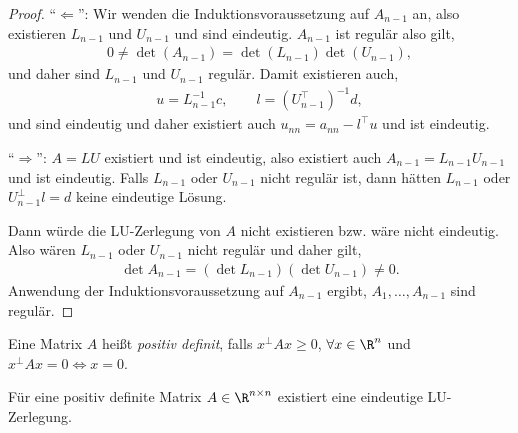 \begin{proof}
``$\Leftarrow$'': Wir wenden die Induktionsvoraussetzung auf $A_{n-1}$ an, also
existieren $L_{n-1}$ und $U_{n-1}$ und sind eindeutig. $A_{n-1}$ ist regulär
also gilt,
\begin{align*}
0 \neq \det(A_{n-1}) = \det(L_{n-1})\det(U_{n-1}),
\end{align*}
und daher sind $L_{n-1}$ und $U_{n-1}$ regulär. Damit existieren auch,
\begin{align*}
u = L_{n-1}^{-1}c,\qquad l = (U_{n-1}^\top)^{-1}d,
\end{align*}
und sind eindeutig und daher existiert auch $u_{nn} = a_{nn}-l^\top u$ und ist
eindeutig.

``$\Rightarrow$'': $A=LU$
existiert und ist eindeutig, also existiert auch $A_{n-1}=L_{n-1}U_{n-1}$ und
ist eindeutig. Falls $L_{n-1}$ oder $U_{n-1}$ nicht regulär ist, dann hätten
$L_{n-1}$ oder $U_{n-1}^\bot l = d$ keine eindeutige Lösung.

Dann würde die LU-Zerlegung von $A$ nicht existieren bzw. wäre nicht eindeutig.
Also wären $L_{n-1}$ oder $U_{n-1}$ nicht regulär und daher gilt,
\begin{align*}
\det A_{n-1} = (\det L_{n-1})(\det U_{n-1})\neq 0.
\end{align*}
Anwendung der Induktionsvoraussetzung auf $A_{n-1}$ ergibt,
$A_1,\ldots,A_{n-1}$ sind regulär.\qedhere
\end{proof}

\begin{defnn}
Eine Matrix $A$ heißt \emph{positiv definit}, falls $x^\bot A x \ge 0$,
$\forall x\in\R^n$ und $x^\bot Ax = 0\Leftrightarrow x = 0$.\fishhere
\end{defnn}

\begin{corn}
Für eine positiv definite Matrix $A\in\R^{n\times n}$ existiert eine eindeutige
LU-Zerlegung.\fishhere
\end{corn}

